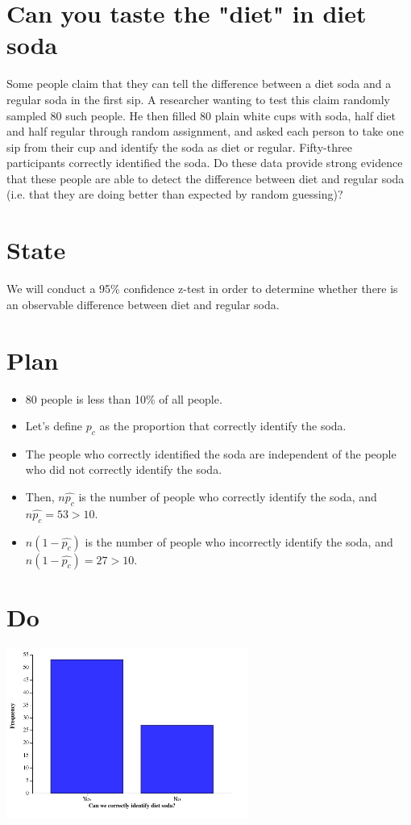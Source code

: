 \documentclass{scrreprt} %
\begin{document}
\section{Can you taste the "diet" in diet soda}

Some people claim that they can tell the difference between a diet soda and a regular soda in the
first sip. A researcher wanting to test this claim randomly sampled 80 such people. He then filled
80 plain white cups with soda, half diet and half regular through random assignment, and asked
each person to take one sip from their cup and identify the soda as diet or regular. Fifty-three
participants correctly identified the soda. Do these data provide strong evidence that these people
are able to detect the difference between diet and regular soda (i.e. that they are doing better
than expected by random guessing)?

\section{State}

We will conduct a 95\% confidence z-test in order to determine whether there
is an observable difference between diet and regular soda.

\section{Plan}

\begin{itemize}
	\item 80 people is less than 10\% of all people.
	\item Let's define $p_c$ as the proportion that correctly identify the soda.
	\item The people who correctly identified the soda are independent of
	the people who did not correctly identify the soda.
	\item Then, $n\hat{p_c}$ is the number of people who correctly identify
	the soda, and $n\hat{p_c} = 53 > 10$.
	\item $n(1-\hat{p_c})$ is the number of people who incorrectly identify the
	soda, and $n(1-\hat{p_c})= 27 > 10$.
\end{itemize}

\section{Do}

\includegraphics[width=300px]{2021-08-31-11-24-27.png}
\end{document}
